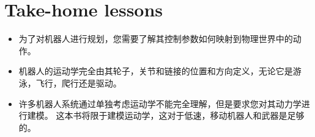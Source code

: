 \section*{Take-home lessons}


\begin{itemize}
\item 为了对机器人进行规划，您需要了解其控制参数如何映射到物理世界中的动作。
\item 机器人的运动学完全由其轮子，关节和链接的位置和方向定义，无论它是游泳，飞行，爬行还是驱动。
\item 许多机器人系统通过单独考虑运动学不能完全理解，但是要求您对其动力学进行建模。 这本书将限于建模运动学，这对于低速，移动机器人和武器是足够的。
\end{itemize} 


